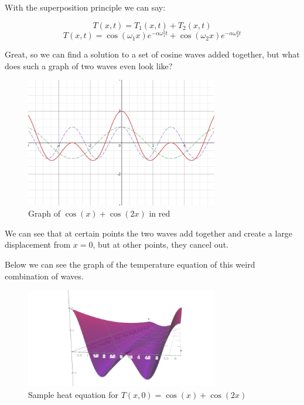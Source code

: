 \documentclass{report}
\begin{document}
\vspace{10pt}

With the superposition principle we can say: 

\[T(x,t) = T_1(x,t) + T_2(x,t) \]
\begin{equation} \label{two_cos_heat_eq_soln}
     T(x,t) = \cos(\omega_1 x)e^{-\alpha\omega_1^2t} + \cos(\omega_2x)e^{-\alpha\omega_2^2t}
\end{equation}

Great, so we can find a solution to a set of cosine waves added together, but what does such a graph of two waves even look like?

\begin{figure}[H]
    \centering
    \includegraphics[width=0.75\textwidth]{images/graph_of_two_cos.png}
    \caption{Graph of $\cos(x) + \cos(2x)$ in red}
\end{figure}

We can see that at certain points the two waves add together and 
create a large displacement from $x=0$, but at other points, they cancel out.

Below we can see the graph of the temperature equation of this weird combination of waves.

\begin{figure}[H]
    \centering
    \includegraphics[width=0.75\textwidth]{images/graph_of_two_cos_heat_equation.png}
    \caption{Sample heat equation for $T(x,0) = \cos(x) + \cos(2x)$}
\end{figure}
\end{document}
